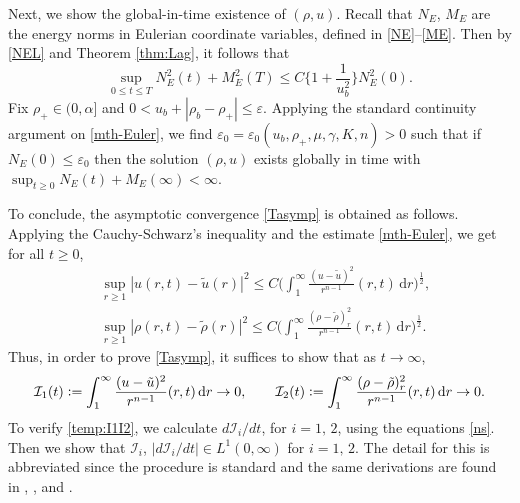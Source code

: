 \documentclass[a4paper,12pt,draft]{article}
\theoremstyle{remark}
\def\dif{{\mathrm d}}
\def\ut{\tilde{u}}
\def\rt{\tilde{\rho}}
\def\ep{\varepsilon}
\begin{document}
Next, we show the global-in-time existence of $(\rho,u)$. Recall that $N_E$, $M_E$ are the energy norms in Eulerian coordinate variables, defined in \eqref{NE}--\eqref{ME}. Then by \eqref{NEL} and Theorem \ref{thm:Lag}, it follows that 
\begin{equation}\label{mth-Euler}
    \sup\limits_{0\le t \le T} N_{E}^2(t) + M_{E}^2(T) \le C \Big\{ 1 + \frac{1}{u_b^2} \Big\} N_E^2(0). 
\end{equation}
Fix $\rho_+\in (0,\alpha]$ and $0<u_b + |\rho_b-\rho_+| \le \ep $. Applying the standard continuity argument on \eqref{mth-Euler}, we find $\ep_0=\ep_0(u_b,\rho_+,\mu,\gamma,K,n)>0$ such that if $N_E(0)\le \ep_0$ then the solution $(\rho,u)$ exists globally in time with $\sup_{ t \ge 0 }N_{E}(t) + M_E(\infty) <\infty$. 

To conclude, the asymptotic convergence \eqref{Tasymp} is obtained as follows. 
Applying the Cauchy-Schwarz's inequality and the estimate \eqref{mth-Euler}, we get for all $t\ge 0$,
\begin{align*}
&\sup_{r\ge 1} |u(r,t)-\ut(r)|^2
\le C \Big( \int_1^\infty \frac{(u-\ut)^2}{r^{n-1}}(r,t) \, \dif r \Big)^{\frac{1}{2}},\\
&\sup_{r \ge 1} |\rho(r,t)-\rt(r)|^2 %
\le C \Big( \int_1^\infty \frac{(\rho-\rt)_r^2}{r^{n-1}}(r,t) \, \dif r \Big)^{\frac{1}{2}}.
\end{align*}
Thus, in order to prove \eqref{Tasymp}, it suffices to show that as $t\to \infty$,
\begin{equation}
\mathcal{I}_1(t)
\vcentcolon=
\int_1^\infty \frac{(u-\ut)^2}{r^{n-1}}(r,t) \, \dif r
\to 0, 
\qquad 
\mathcal{I}_2(t)
\vcentcolon=
\int_1^\infty \frac{(\rho-\rt)_r^2}{r^{n-1}}(r,t) \, \dif r
\to 0.
\label{temp:I1I2}
\end{equation}
To verify \eqref{temp:I1I2}, we calculate $d\mathcal{I}_{i}/dt$, for $i=1,\,2$, using the equations \eqref{ns}. Then we show that $\mathcal{I}_i$, $|d\mathcal{I}_{i}/dt| \in L^1(0,\infty)$ for $i=1,\,2$. The detail for this is abbreviated since the procedure is standard   and the same derivations are found in \cite{k-n-z03}, \cite{k-n81}, \cite{NNY}
and
\cite{NN}. 
\end{document}
